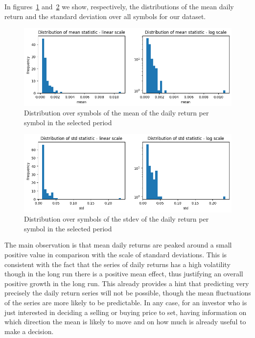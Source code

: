 \documentclass[10pt]{article}
\begin{document}
In figures~{\ref{578995}}
and~{\ref{257303}} we show, respectively, the
distributions of the mean daily return and the standard deviation over
all symbols for our dataset. ~
\begin{figure}[H]
\begin{center}
\includegraphics[width=0.98\columnwidth]{figures/output1/output1}
\caption{{Distribution over symbols of the mean of the daily return per symbol in
the selected period
{\label{578995}}%
}}
\end{center}
\end{figure}
\begin{figure}[H]
\begin{center}
\includegraphics[width=0.98\columnwidth]{figures/output2/output2}
\caption{{Distribution over symbols of the stdev of the daily return per symbol in
the selected period~
{\label{257303}}%
}}
\end{center}
\end{figure}

The main observation is that mean daily returns are peaked around a
small positive value in comparison with the scale of standard
deviations. This is consistent with the fact that the series of daily
returns has a high volatility though in the long run there is a positive
mean effect, thus justifying an overall positive growth in the long run.
This already provides a hint that predicting very precisely the daily
return series will not be possible, though the mean fluctuations of the
series are more likely to be predictable. In any case, for an investor
who is just interested in deciding a selling or buying price to set,
having information on which direction the mean is likely to move and on
how much is already useful to make a decision.
\end{document}
